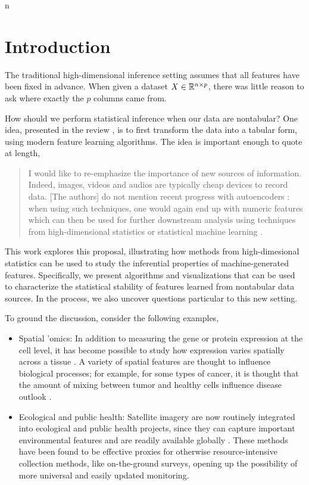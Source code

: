 n\section{Introduction}

The traditional high-dimensional inference setting assumes that all features
have been fixed in advance. When given a dataset $X \in \mathbb{R}^{n \times p}$,
there was little reason to ask where exactly the $p$ columns came from. 


How should we perform statistical inference when our data are nontabular? One
idea, presented in the review \citep{buhlmann2019comments}, is to first
transform the data into a tabular form, using modern feature learning
algorithms. The idea is important enough to quote at length,

\begin{quote}
I would like to re-emphasize the importance of new sources of information.
Indeed, images, videos and audios are typically cheap devices to record data.
[The authors] do not mention recent progress with autoencoders
\citep{hinton2006reducing, vincent2010stacked}: when using such techniques, one
would again end up with numeric features which can then be used for further
downstream analysis using techniques from high-dimensional statistics or
statistical machine learning \citep{hastie2015statistical,
  buhlmann2011statistics}.
\end{quote}

This work explores this proposal, illustrating how methods from high-dimesional
statistics can be used to study the inferential properties of machine-generated
features. Specifically, we present algorithms and visualizations that can be
used to characterize the statistical stability of features learned from
nontabular data sources. In the process, we also uncover questions particular to
this new setting.

To ground the discussion, consider the following examples,

\begin{itemize}
\item Spatial 'omics: In addition to measuring the gene or protein expression at
  the cell level, it has become possible to study how expression varies
  spatially across a tissue \citep{burgess2019spatial, lundberg2019spatial}. A
  variety of spatial features are thought to influence biological processes; for
  example, for some types of cancer, it is thought that the amount of mixing
  between tumor and healthy cells influence disease outlook
  \citep{keren2018structured}.
\item Ecological and public health: Satellite imagery are now routinely
  integrated into ecological and public health projects, since they can capture
  important environmental features and are readily available globally
  \citep{jean2016combining, wu2020air, bondimapping}. These methods have been found to be effective
  proxies for otherwise resource-intensive collection methods, like
  on-the-ground surveys, opening up the possibility of more universal and easily
  updated monitoring.
\end{itemize}


